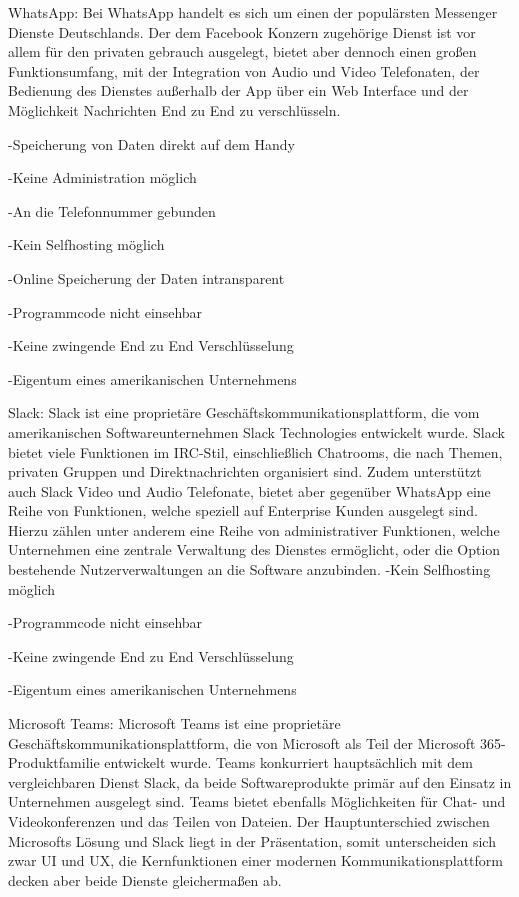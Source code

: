 WhatsApp: Bei WhatsApp handelt es sich um einen der populärsten Messenger Dienste Deutschlands. Der dem Facebook Konzern zugehörige Dienst ist vor allem für den privaten gebrauch ausgelegt, bietet aber dennoch einen großen Funktionsumfang, mit der Integration von Audio und Video Telefonaten, der Bedienung des Dienstes außerhalb der App über ein Web Interface und der Möglichkeit Nachrichten End zu End zu verschlüsseln.

-Speicherung von Daten direkt auf dem Handy

-Keine Administration möglich 

-An die Telefonnummer gebunden

-Kein Selfhosting möglich 

-Online Speicherung der Daten intransparent

-Programmcode nicht einsehbar

-Keine zwingende End zu End Verschlüsselung

-Eigentum eines amerikanischen Unternehmens

Slack: Slack ist eine proprietäre Geschäftskommunikationsplattform, die vom amerikanischen Softwareunternehmen Slack Technologies entwickelt wurde. Slack bietet viele Funktionen im IRC-Stil, einschließlich Chatrooms, die nach Themen, privaten Gruppen und Direktnachrichten organisiert sind. Zudem unterstützt auch Slack Video und Audio Telefonate, bietet aber gegenüber WhatsApp eine Reihe von Funktionen, welche speziell auf Enterprise Kunden ausgelegt sind. Hierzu zählen unter anderem eine Reihe von administrativer Funktionen, welche Unternehmen eine zentrale Verwaltung des Dienstes ermöglicht, oder die Option bestehende Nutzerverwaltungen an die Software anzubinden.
-Kein Selfhosting möglich

-Programmcode nicht einsehbar

-Keine zwingende End zu End Verschlüsselung

-Eigentum eines amerikanischen Unternehmens

Microsoft Teams: Microsoft Teams ist eine proprietäre Geschäftskommunikationsplattform, die von Microsoft als Teil der Microsoft 365-Produktfamilie entwickelt wurde. Teams konkurriert hauptsächlich mit dem vergleichbaren Dienst Slack, da beide Softwareprodukte primär auf den Einsatz in Unternehmen ausgelegt sind. Teams bietet ebenfalls Möglichkeiten für Chat- und Videokonferenzen und das Teilen von Dateien. Der Hauptunterschied zwischen Microsofts Lösung und Slack liegt in der Präsentation, somit unterscheiden sich zwar UI und UX, die Kernfunktionen einer modernen Kommunikationsplattform decken aber beide Dienste gleichermaßen ab.

